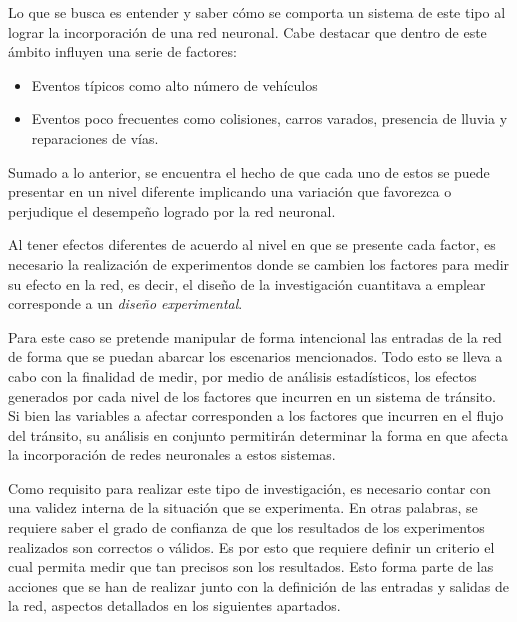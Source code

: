	Lo que se busca es entender y saber c\'{o}mo se comporta un sistema de este
tipo al lograr la incorporaci\'{o}n de una red neuronal. Cabe destacar que
dentro de este \'{a}mbito influyen una serie de factores:

\begin{itemize}
  \item Eventos t\'{i}picos como alto n\'{u}mero de veh\'{i}culos
  \item Eventos poco frecuentes como colisiones, carros varados, presencia de
  lluvia y reparaciones de v\'{i}as.
\end{itemize} 

	Sumado a lo anterior, se encuentra el hecho de que cada uno de estos se puede
	presentar en un nivel diferente implicando una variaci\'{o}n que favorezca o
	perjudique el desempe\~{n}o logrado por la red neuronal.
	
	 Al tener efectos diferentes de acuerdo al nivel en que se presente cada
factor, es necesario la realizaci\'{o}n de experimentos donde se cambien los
 factores para medir su efecto en la red,
 es decir, el dise\~{n}o de la investigaci\'{o}n cuantitava a emplear
 corresponde a un \textit{dise\~{n}o experimental}.
 
 	Para este caso se pretende manipular de forma intencional las entradas de la
 red de forma que se puedan abarcar los escenarios mencionados. Todo esto se
 lleva a cabo con la finalidad de medir, por medio de an\'{a}lisis
 estad\'{i}sticos, los efectos generados por cada nivel de los factores que
 incurren en un sistema de tr\'{a}nsito. Si bien las variables a afectar
 corresponden a los factores que incurren en el flujo del tr\'{a}nsito, su
 an\'{a}lisis en conjunto permitir\'{a}n determinar la forma en que afecta la
 incorporaci\'{o}n de redes neuronales a estos sistemas.
 
  	Como requisito para realizar este tipo de investigaci\'{o}n, es necesario
contar con una validez interna de la situaci\'{o}n que se experimenta. En
otras palabras, se requiere saber el grado de confianza de que los resultados
de los experimentos realizados son correctos o v\'{a}lidos. Es por esto que
requiere definir un criterio el cual permita medir que tan precisos son los
resultados. Esto forma parte de las acciones que se han de realizar junto
con la definici\'{o}n de las entradas y salidas de la red, aspectos detallados
en los siguientes apartados.


 
	
	
	
	
